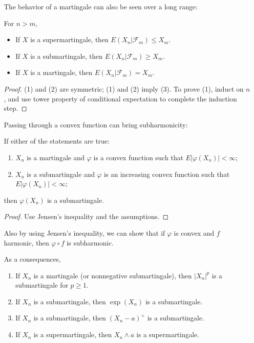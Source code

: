 The behavior of a martingale can also be seen over a long range:
\begin{proposition}
	For $n > m$,
	\begin{itemize}
		\item If $X$ is a supermartingale, then $E(X_n | \mathcal{F}_m) \le X_m$.
		\item If $X$ is a submartingale, then $E(X_n | \mathcal{F}_m) \ge X_m$.
		\item If $X$ is a martingale, then $E(X_n | \mathcal{F}_m) = X_m$.
	\end{itemize}
\end{proposition}
\begin{proof}
	(1) and (2) are symmetric; (1) and (2) imply (3). To prove (1), induct on $n$, and use tower property of conditional expectation to complete the induction step.
\end{proof}

Passing through a convex function can bring subharmonicity:
\begin{theorem}
	\label{thm:convexSubmartingale}
	If either of the statements are true:
	\begin{enumerate}
		\item $X_n$ is a martingale and $\varphi$ is a convex function such that $E|\varphi(X_n)| < \infty $;
		\item $X_n$ is a submartingale and $\varphi$ is an increasing convex function such that $E|\varphi(X_n)| < \infty $;
	\end{enumerate}
	then $\varphi(X_n)$ is a submartingale.
\end{theorem}
\begin{proof}
	Use Jensen's inequality and the assumptions.
\end{proof}
\begin{remark}
	Also by using Jensen's inequality, we can show that if $\varphi$ is convex and $f$ harmonic, then $\varphi \circ f$ is subharmonic.
\end{remark}
\begin{example}
	As a consequences, 
	\begin{enumerate}
		\item If $X_n$ is a martingale (or nonnegative submartingale), then $|X_n|^p$ is a submartingale for $p \ge 1$.
		\item If $X_n$ is a submartingale, then $\exp(X_n)$ is a submartingale.
		\item If $X_n$ is a submartingale, then $(X_n - a)^+$ is a submartingale.
		\item If $X_n$ is a supermartingale, then $X_n \wedge a$ is a supermartingale.
	\end{enumerate}
\end{example}

